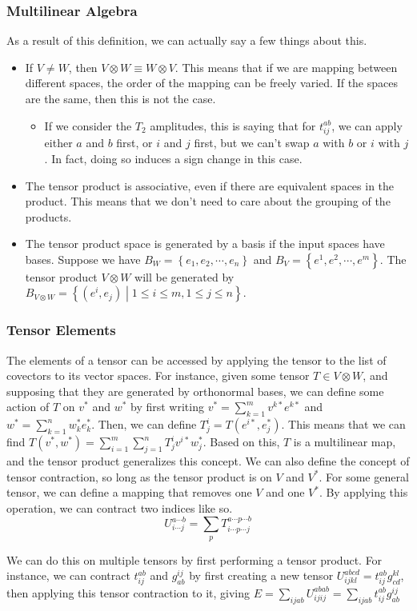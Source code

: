 \documentclass[10pt]{beamer}
\begin{document}
\begin{frame}
  \frametitle{Multilinear Algebra}
  As a result of this definition, we can actually say a few things about this.
  \begin{itemize}
  \item If $V \ne W$, then $V \otimes W \equiv W \otimes V$. This means that if we are mapping between different spaces, the order of the mapping can be freely varied. If the spaces are the same, then this is not the case.
    \begin{itemize}
    \item If we consider the $T_2$ amplitudes, this is saying that for $t_{ij}^{ab}$, we can apply either $a$ and $b$ first, or $i$ and $j$ first, but we can't swap $a$ with $b$ or $i$ with $j$. In fact, doing so induces a sign change in this case.
    \end{itemize}
    \item The tensor product is associative, even if there are equivalent spaces in the product. This means that we don't need to care about the grouping of the products.
    \item The tensor product space is generated by a basis if the input spaces have bases. Suppose we have $B_W = \left\{e_1, e_2, \cdots, e_n\right\}$ and $B_V = \left\{e^1, e^2, \cdots, e^m\right\}$. The tensor product $V \otimes W$ will be generated by $B_{V\otimes W} = \left\{\left(e^i, e_j\right)\middle| 1 \le i \le m, 1 \le j \le n\right\}$. 
  \end{itemize}
\end{frame}

\begin{frame}
  \frametitle{Tensor Elements}
  The elements of a tensor can be accessed by applying the tensor to the list of covectors to its vector spaces. For instance, given some tensor $T \in V\otimes W$, and supposing that they are generated by orthonormal bases, we can define some action of $T$ on $v^*$ and $w^*$ by first writing $v^* = \sum_{k = 1}^mv^{k*}e^{k*}$ and $w^* = \sum_{k = 1}^nw_k^*e_k^*$. Then, we can define $T_j^i = T(e^{i*}, e_j^*)$. This means that we can find $T(v^*, w^*) = \sum_{i=1}^m\sum_{j=1}^nT_j^iv^{i*}w_j^*$. Based on this, $T$ is a multilinear map, and the tensor product generalizes this concept. We can also define the concept of tensor contraction, so long as the tensor product is on $V$ and $V^*$. For some general tensor, we can define a mapping that removes one $V$ and one $V^*$. By applying this operation, we can contract two indices like so.
  $$U_{i\cdots j}^{a \cdots b} = \sum_p T_{i\cdots p \cdots j}^{a \cdots p \cdots b}$$

  We can do this on multiple tensors by first performing a tensor product. For instance, we can contract $t_{ij}^{ab}$ and $g_{ab}^{ij}$ by first creating a new tensor $U_{ijkl}^{abcd} = t_{ij}^{ab}g_{cd}^{kl}$, then applying this tensor contraction to it, giving $E = \sum_{ijab} U_{ijij}^{abab} = \sum_{ijab}t_{ij}^{ab}g_{ab}^{ij}$
\end{frame}
\end{document}
